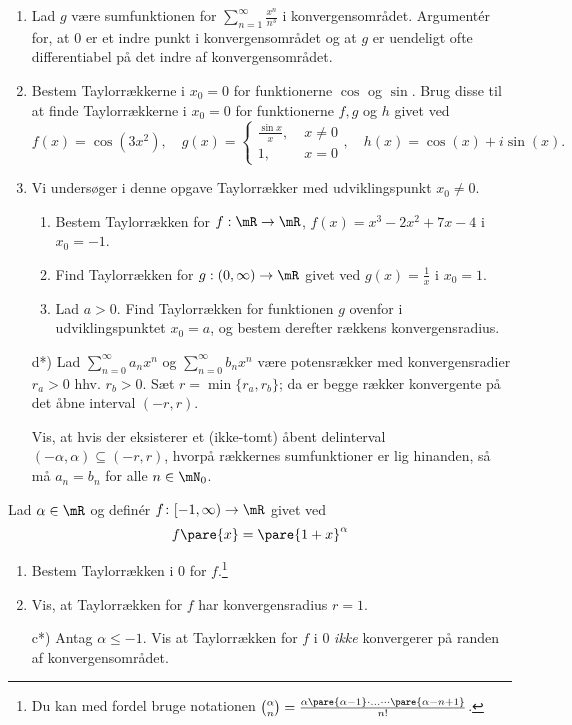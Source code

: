 \begin{opg} \hfill
\begin{enumerate}
	\item Lad $g$ være sumfunktionen for $\sum_{n=1}^\infty \frac{x^n}{n^3}$ i konvergensområdet. Argumentér for, at $0$ er et indre punkt i konvergensområdet og at $g$ er uendeligt ofte differentiabel på det indre af konvergensområdet. 
	
	\item Bestem Taylorrækkerne i $x_0=0$ for funktionerne $\cos$ og $\sin$. Brug disse til at finde Taylorrækkerne i $x_0=0$ for funktionerne $f, g$ og $h$ givet ved
	$$ f(x) = \cos(3x^2), \quad 
	    g(x) =\begin{cases}
            \frac{\sin x}{x}, \; &x \neq 0  \\
            1, \; &x= 0 \end{cases}, \quad
        h(x) = \cos(x)+ i \sin(x). $$

	\item Vi undersøger i denne opgave Taylorrækker med udviklingspunkt $x_0\neq 0$.
	\begin{enumerate}[label=\roman*)]
		\item Bestem Taylorrækken for
		 $f: \mR \to \mR$, $ f(x)=x^3 - 2x^2 + 7x -4$ i  $x_0=-1$.
		\item Find  Taylorrækken for
		$g: (0,\infty) \to \mR$ givet ved $g(x) = \frac{1}{x}$ i $x_0=1$.
		\item Lad $a>0$.  Find  Taylorrækken for funktionen $g$ ovenfor i udviklingspunktet $x_0=a$, og bestem derefter rækkens konvergensradius.
	\end{enumerate}

	\item[d*)] Lad $\sum_{n=0}^\infty a_n x^n$ og $\sum_{n=0}^\infty b_n x^n$ være potensrækker med konvergensradier $r_a>0$ hhv. $r_b >0$. Sæt $r=\min\{r_a, r_b\}$; da er begge rækker konvergente på det åbne interval $(-r,r)$.
	
	Vis, at hvis der eksisterer et (ikke-tomt) åbent delinterval $(-\alpha, \alpha) \subseteq (-r,r)$, hvorpå rækkernes sumfunktioner er lig hinanden, så må $a_n=b_n$ for alle $n \in \mN_0$.
\end{enumerate}
\end{opg}

\begin{opg}
Lad $\alpha\in\mR$ og definér $f\colon [-1,\infty)\to\mR$ givet ved
$$ f\pare{x} = \pare{1+x}^\alpha $$
\begin{enumerate}
    \item Bestem Taylorrækken i $0$ for $f$.\footnote{Du kan med fordel bruge notationen $\binom{\alpha}{n} = \frac{\alpha\pare{\alpha-1}\cdot\ldots\cdots\pare{\alpha-n+1}}{n!}$.}
    
    \item Vis, at Taylorrækken for $f$ har konvergensradius $r = 1$.
    
    \item[c*)] Antag $\alpha\leq -1$. Vis at Taylorrækken for $f$ i $0$ \textit{ikke} konvergerer på randen af konvergensområdet.
\end{enumerate}
\end{opg}

